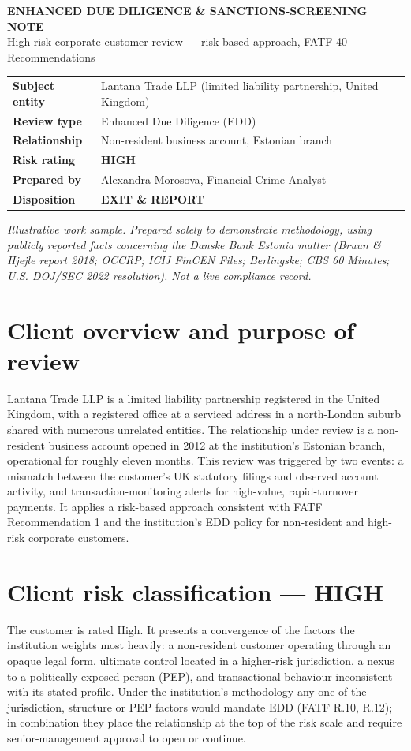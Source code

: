 \documentclass[10.5pt]{article}
\newcommand{\HeaderRow}[2]{\textbf{#1} & #2 \\}
\begin{document}
\thispagestyle{fancy}

{\large\bfseries\color{navy} ENHANCED DUE DILIGENCE \& SANCTIONS-SCREENING NOTE}\\[2pt]
{\small High-risk corporate customer review --- risk-based approach, FATF 40 Recommendations}

\vspace{6pt}
\noindent
\renewcommand{\arraystretch}{1.3}
\begin{tabular}{@{}L{4.2cm}L{11.5cm}@{}}
\HeaderRow{Subject entity}{Lantana Trade LLP (limited liability partnership, United Kingdom)}
\HeaderRow{Review type}{Enhanced Due Diligence (EDD)}
\HeaderRow{Relationship}{Non-resident business account, Estonian branch}
\HeaderRow{Risk rating}{\textbf{HIGH}}
\HeaderRow{Prepared by}{Alexandra Morosova, Financial Crime Analyst}
\HeaderRow{Disposition}{\textbf{EXIT \& REPORT}}
\end{tabular}

\vspace{4pt}
{\footnotesize\itshape Illustrative work sample. Prepared solely to demonstrate methodology, using publicly reported facts concerning the Danske Bank Estonia matter (Bruun \& Hjejle report 2018; OCCRP; ICIJ FinCEN Files; Berlingske; CBS 60 Minutes; U.S. DOJ/SEC 2022 resolution). Not a live compliance record.}

\section{Client overview and purpose of review}
Lantana Trade LLP is a limited liability partnership registered in the United Kingdom, with a registered office at a serviced address in a north-London suburb shared with numerous unrelated entities. The relationship under review is a non-resident business account opened in 2012 at the institution's Estonian branch, operational for roughly eleven months. This review was triggered by two events: a mismatch between the customer's UK statutory filings and observed account activity, and transaction-monitoring alerts for high-value, rapid-turnover payments. It applies a risk-based approach consistent with FATF Recommendation 1 and the institution's EDD policy for non-resident and high-risk corporate customers.

\section{Client risk classification --- HIGH}
The customer is rated High. It presents a convergence of the factors the institution weights most heavily: a non-resident customer operating through an opaque legal form, ultimate control located in a higher-risk jurisdiction, a nexus to a politically exposed person (PEP), and transactional behaviour inconsistent with its stated profile. Under the institution's methodology any one of the jurisdiction, structure or PEP factors would mandate EDD (FATF R.10, R.12); in combination they place the relationship at the top of the risk scale and require senior-management approval to open or continue.
\end{document}
